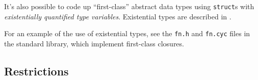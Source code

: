 It's also possible to code up ``first-class'' abstract data types
using \texttt{struct}s with \emph{existentially quantified type
  variables}.  Existential types are described in
.

For an example of the use of existential types, see the \texttt{fn.h}
and \texttt{fn.cyc} files in the standard library, which implement
first-class closures.

\subsection{Restrictions}

